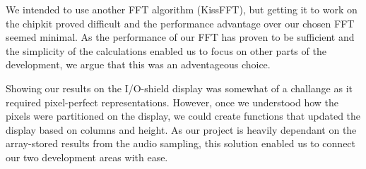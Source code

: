 \documentclass[a4paper,11pt]{article}
\begin{document}
We intended to use another FFT algorithm (KissFFT), but getting it to work on the chipkit proved difficult and the performance advantage over our chosen FFT seemed minimal. As the performance of our FFT has proven to be sufficient and the simplicity of the calculations enabled us to focus on other parts of the development, we argue that this was an adventageous choice.

Showing our results on the I/O-shield display was somewhat of a challange as it required pixel-perfect representations. However, once we understood how the pixels were partitioned on the display, we could create functions that updated the display based on columns and height. As our project is heavily dependant on the array-stored results from the audio sampling, this solution enabled us to connect our two development areas with ease.
\end{document}
